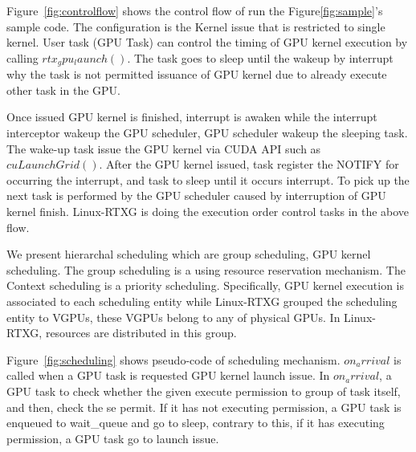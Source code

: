 Figure~\ref{fig:controlflow} shows the control flow of run the Figure\ref{fig:sample}'s sample code.
The configuration is the Kernel issue that is restricted to single kernel.
User task (GPU Task) can control the timing of GPU kernel execution by calling $rtx_gpu_launch()$.
The task goes to sleep until the wakeup by interrupt why the task is not permitted issuance of GPU kernel due to already execute other task in the GPU.

Once issued GPU kernel is finished,
interrupt is awaken while the interrupt interceptor wakeup the GPU scheduler, GPU scheduler wakeup the sleeping task. 
The wake-up task issue the GPU kernel via CUDA API such as $cuLaunchGrid()$.
After the GPU kernel issued, task register the NOTIFY for occurring the interrupt,
and task to sleep until it occurs interrupt.
To pick up the next task is performed by the GPU scheduler caused by interruption of GPU kernel finish.
Linux-RTXG is doing the execution order control tasks in the above flow.

We present hierarchal scheduling which are group scheduling, GPU kernel scheduling.
The group scheduling is a using resource reservation mechanism.
The Context scheduling is a priority scheduling.
Specifically, GPU kernel execution is associated to each scheduling entity while Linux-RTXG grouped the scheduling entity to VGPUs, these VGPUs belong to any of physical GPUs.
In Linux-RTXG, resources are distributed in this group.

Figure~\ref{fig:scheduling} shows pseudo-code of scheduling mechanism.
$on_arrival$ is called when a GPU task is requested GPU kernel launch issue.
In $on_arrival$, a GPU task to check whether the given execute permission to group of task itself, and then, check the se permit.
If it has not executing permission, a GPU task is enqueued to wait\_queue and go to sleep,
contrary to this, if it has executing permission, a GPU task go to launch issue.

